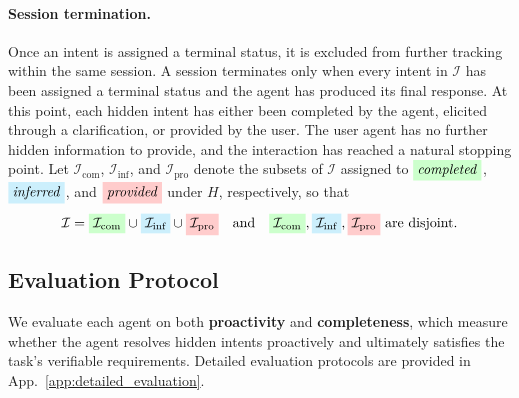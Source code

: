 \documentclass{llmxive}
\providecommand{\completed}{\colorbox{green!20}{\textit{completed}}}
\providecommand{\inferred}{\colorbox{cyan!20}{\textit{inferred}}}
\providecommand{\provided}{\colorbox{red!20}{\textit{provided}}}
\providecommand{\intentcompleted}{\colorbox{green!20}{$\mathcal{I}_\text{com}$}}
\providecommand{\intentinferred}{\colorbox{cyan!20}{$\mathcal{I}_\text{inf}$}}
\providecommand{\intentprovided}{\colorbox{red!20}{$\mathcal{I}_\text{pro}$}}
\begin{document}
\paragraph{Session termination.}
Once an intent is assigned a terminal status, it is excluded from further tracking within the same session. 
A session terminates only when every intent in $\mathcal{I}$ has been assigned a terminal status and the agent has produced its final response. 
At this point, each hidden intent has either been completed by the agent, elicited through a clarification, or provided by the user. The user agent has no further hidden information to provide, and the interaction has reached a natural stopping point.
Let {\intentcompleted}, {\intentinferred}, and {\intentprovided} denote the subsets of $\mathcal{I}$ assigned to $\completed$, $\inferred$, and $\provided$ under $H$, respectively, so that
\begin{equation}
\mathcal{I}={\intentcompleted}\cup {\intentinferred}\cup {\intentprovided}
\quad\text{and}\quad
{\intentcompleted},{\intentinferred},{\intentprovided}\ \text{are disjoint.}
\end{equation}

\subsection{Evaluation Protocol}
\label{sec:evaluation}

We evaluate each agent on both \textbf{proactivity} and \textbf{completeness}, which measure whether the agent resolves hidden intents proactively and ultimately satisfies the task's verifiable requirements. Detailed evaluation protocols are provided in App.~\ref{app:detailed_evaluation}.

\end{document}
